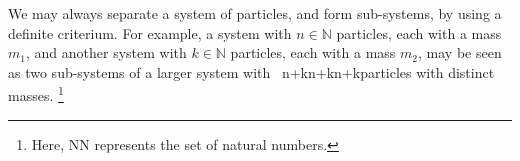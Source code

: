 We may always separate a system of particles, and form sub-systems, by using a definite criterium. For example, a system with $n\in\mathbb{N}$ particles, each with a mass $m_1$, and another system with $k\in\mathbb{N}$ particles, each with a mass $m_2$, may be seen as two sub-systems of a larger system with  n+kn+kn+k​ particles with distinct masses. \footnote{Here, NN​ represents the set of natural numbers.}